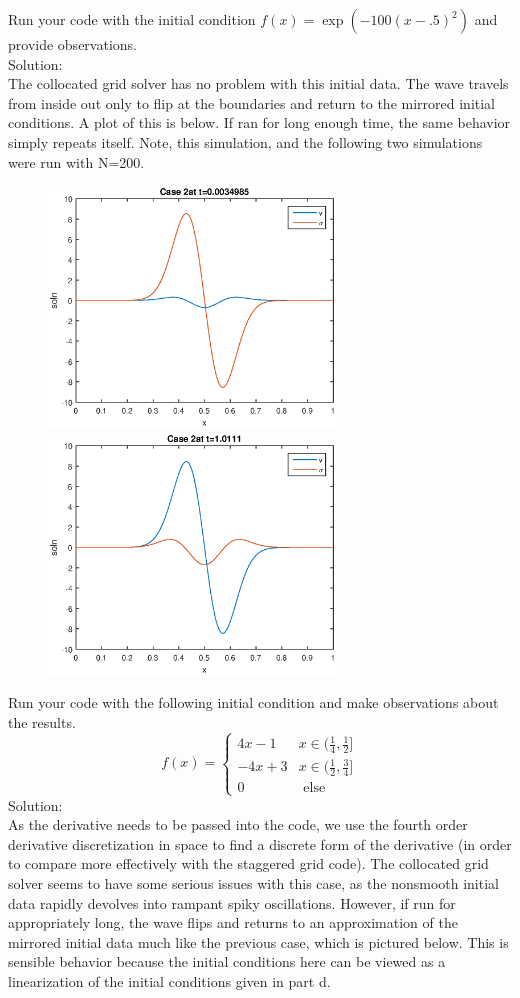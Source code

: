 \item Run your code with the initial condition $f(x)=\exp(-100(x-.5)^2)$ and provide observations.\\
Solution:\\
The collocated grid solver has no problem with this initial data. The wave travels from inside out only to flip at the boundaries and return to the mirrored initial conditions. A plot of this is below. If ran for long enough time, the same behavior simply repeats itself. Note, this simulation, and the following two simulations were run with N=200.
\begin{figure}[h]
\centering
\includegraphics[width=3in]{initCol2}
\includegraphics[width=3in]{endCol2}
\end{figure}
\item Run your code with the following initial condition and make observations about the results.
$$f(x)=\left\{\begin{array}{cc}4x-1&x\in(\frac{1}{4},\frac{1}{2}]\\-4x+3&x\in(\frac{1}{2},\frac{3}{4}]\\0&\text{ else }\end{array}\right.$$
Solution:\\
As the derivative needs to be passed into the code, we use the fourth order derivative discretization in space to find a discrete form of the derivative (in order to compare more effectively with the staggered grid code). The collocated grid solver seems to have some serious issues with this case, as the nonsmooth initial data rapidly devolves into rampant spiky oscillations. However, if run for appropriately long, the wave flips and returns to an approximation of the mirrored initial data much like the previous case, which is pictured below. This is sensible behavior because the initial conditions here can be viewed as a linearization of the initial conditions given in part d.

